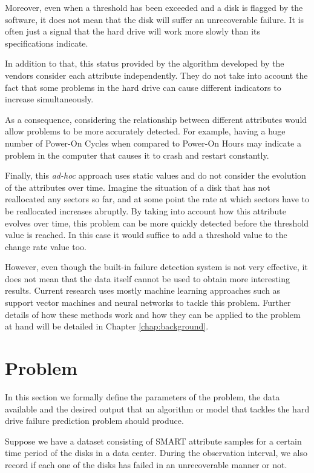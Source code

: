 Moreover, even when a threshold has been exceeded and a disk is flagged by the software, it does not mean that the disk will suffer an unrecoverable failure.
It is often just a signal that the hard drive will work more slowly than its specifications indicate.

In addition to that, this status provided by the algorithm developed by the vendors consider each attribute independently.
They do not take into account the fact that some problems in the hard drive can cause different indicators to increase simultaneously.

As a consequence, considering the relationship between different attributes would allow problems to be more accurately detected.
For example, having a huge number of Power-On Cycles when compared to Power-On Hours may indicate a problem in the computer that causes it to crash and restart constantly.

Finally, this \textit{ad-hoc} approach uses static values and do not consider the evolution of the attributes over time.
Imagine the situation of a disk that has not reallocated any sectors so far, and at some point the rate at which sectors have to be reallocated increases abruptly.
By taking into account how this attribute evolves over time, this problem can be more quickly detected before the threshold value is reached.
In this case it would suffice to add a threshold value to the change rate value too.

However, even though the built-in failure detection system is not very effective, it does not mean that the data itself cannot be used to obtain more interesting results.
Current research uses mostly machine learning approaches such as support vector machines and neural networks to tackle this problem.
Further details of how these methods work and how they can be applied to the problem at hand will be detailed in Chapter \ref{chap:background}. 

\section{Problem}\label{sec:problem}

In this section we formally define the parameters of the problem, the data available and the desired output that an algorithm or model that tackles the hard drive failure prediction problem should produce.

Suppose we have a dataset consisting of SMART attribute samples for a certain time period of the disks in a data center.
During the observation interval, we also record if each one of the disks has failed in an unrecoverable manner or not.

